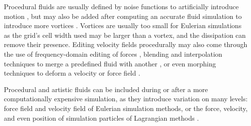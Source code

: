 Procedural fluids are usually defined by noise functions to artificially introduce motion \cite{Bridson2007c}, but may also be added after computing an accurate fluid simulation to introduce more vortices \cite{Wang2025}. Vortices are usually too small for Eulerian simulations as the grid's cell width used may be larger than a vortex, and the dissipation can remove their presence. Editing velocity fields procedurally may also come through the use of frequency-domain editing of forces \cite{Forootaninia2020, Tang2021}, blending and interpolation techniques to merge a predefined fluid with another \cite{Raveendran2014}, or even morphing techniques to deform a velocity or force field \cite{Lu2019,Raveendran2012,Flynn2019}.

Procedural and artistic fluids can be included during or after a more computationally expensive simulation, as they introduce variation on many levels: force field and velocity field of Eulerian simulation methods, or the force, velocity, and even position of simulation particles of Lagrangian methods \cite{Sims1990}.






